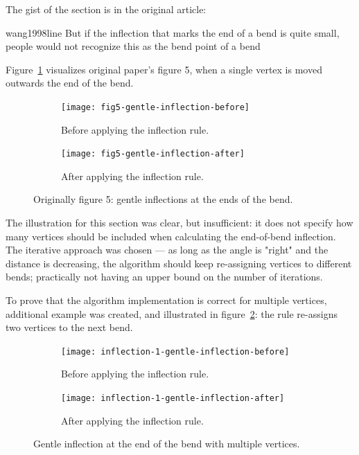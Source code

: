 \documentclass[a4paper]{article}
\begin{document}
The gist of the section is in the original article:

\begin{displaycquote}{wang1998line}
    But if the inflection that marks the end of a bend is quite small, people
    would not recognize this as the bend point of a bend
\end{displaycquote}

Figure~\ref{fig:fig5-gentle-inflection} visualizes original paper's figure 5,
when a single vertex is moved outwards the end of the bend.

\begin{figure}[ht]
    \centering
    \begin{subfigure}[b]{.49\textwidth}
        \texttt{[image: fig5-gentle-inflection-before]}
        \caption{Before applying the inflection rule.}
    \end{subfigure}
    \hfill
    \begin{subfigure}[b]{.49\textwidth}
        \texttt{[image: fig5-gentle-inflection-after]}
        \caption{After applying the inflection rule.}
    \end{subfigure}
    \caption{Originally figure 5: gentle inflections at the ends of the bend.}
    \label{fig:fig5-gentle-inflection}
\end{figure}

The illustration for this section was clear, but insufficient: it does not
specify how many vertices should be included when calculating the end-of-bend
inflection. The iterative approach was chosen --- as long as the angle is "right"
and the distance is decreasing, the algorithm should keep re-assigning vertices
to different bends; practically not having an upper bound on the number of
iterations.

To prove that the algorithm implementation is correct for multiple vertices,
additional example was created, and illustrated in
figure~\ref{fig:inflection-1-gentle-inflection}: the rule re-assigns two
vertices to the next bend.

\begin{figure}[ht]
    \centering
    \begin{subfigure}[b]{.49\textwidth}
        \texttt{[image: inflection-1-gentle-inflection-before]}
        \caption{Before applying the inflection rule.}
    \end{subfigure}
    \hfill
    \begin{subfigure}[b]{.49\textwidth}
        \texttt{[image: inflection-1-gentle-inflection-after]}
        \caption{After applying the inflection rule.}
    \end{subfigure}
    \caption{Gentle inflection at the end of the bend with multiple vertices.}
    \label{fig:inflection-1-gentle-inflection}
\end{figure}
\end{document}
